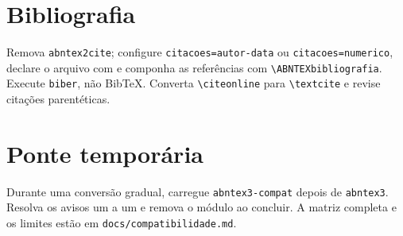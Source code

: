 \documentclass[12pt]{article}
\begin{document}
\section{Bibliografia}

Remova \texttt{abntex2cite}; configure \texttt{citacoes=autor-data} ou
\texttt{citacoes=numerico}, declare o arquivo com
\verb|| e componha as referências com
\verb|\ABNTEXbibliografia|. Execute \texttt{biber}, não BibTeX. Converta
\verb|\citeonline| para \verb|\textcite| e revise citações parentéticas.

\section{Ponte temporária}

Durante uma conversão gradual, carregue \texttt{abntex3-compat} depois de
\texttt{abntex3}. Resolva os avisos um a um e remova o módulo ao concluir.
A matriz completa e os limites estão em \texttt{docs/compatibilidade.md}.
\end{document}
